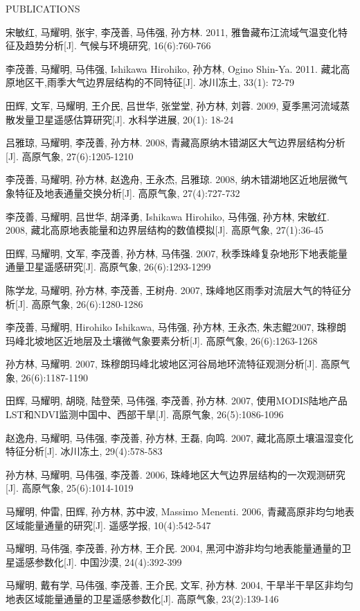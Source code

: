 \documentclass{resume} %
\begin{document}
\begin{rSection}{PUBLICATIONS}
\begin{etaremune}
  \item 宋敏红, 马耀明, 张宇, 李茂善, 马伟强, 孙方林. 2011, 雅鲁藏布江流域气温变化特征及趋势分析[J]. 气候与环境研究, 16(6):760-766
  \item 李茂善, 马耀明, 马伟强, Ishikawa Hirohiko, 孙方林, Ogino Shin-Ya. 2011. 藏北高原地区干,雨季大气边界层结构的不同特征[J]. 冰川冻土, 33(1): 72-79
  \item 田辉, 文军, 马耀明, 王介民, 吕世华, 张堂堂, 孙方林, 刘蓉. 2009, 夏季黑河流域蒸散发量卫星遥感估算研究[J]. 水科学进展, 20(1): 18-24
  \item  吕雅琼, 马耀明, 李茂善, 孙方林. 2008, 青藏高原纳木错湖区大气边界层结构分析[J]. 高原气象, 27(6):1205-1210
  \item 李茂善, 马耀明, 孙方林, 赵逸舟, 王永杰, 吕雅琼. 2008, 纳木错湖地区近地层微气象特征及地表通量交换分析[J]. 高原气象, 27(4):727-732
  \item 李茂善, 马耀明, 吕世华, 胡泽勇, Ishikawa Hirohiko, 马伟强, 孙方林, 宋敏红. 2008, 藏北高原地表能量和边界层结构的数值模拟[J]. 高原气象, 27(1):36-45
  \item 田辉, 马耀明, 文军, 李茂善, 孙方林, 马伟强. 2007, 秋季珠峰复杂地形下地表能量通量卫星遥感研究[J]. 高原气象, 26(6):1293-1299
  \item 陈学龙, 马耀明, 孙方林, 李茂善, 王树舟. 2007, 珠峰地区雨季对流层大气的特征分析[J]. 高原气象, 26(6):1280-1286
  \item 李茂善, 马耀明, Hirohiko Ishikawa, 马伟强, 孙方林, 王永杰, 朱志鲲2007, 珠穆朗玛峰北坡地区近地层及土壤微气象要素分析[J]. 高原气象, 26(6):1263-1268
  \item 孙方林, 马耀明. 2007, 珠穆朗玛峰北坡地区河谷局地环流特征观测分析[J]. 高原气象, 26(6):1187-1190
  \item 田辉, 马耀明, 胡晓, 陆登荣, 马伟强, 李茂善, 孙方林. 2007, 使用MODIS陆地产品LST和NDVI监测中国中、西部干旱[J]. 高原气象, 26(5):1086-1096
  \item 赵逸舟, 马耀明, 马伟强, 李茂善, 孙方林, 王磊, 向鸣. 2007, 藏北高原土壤温湿变化特征分析[J]. 冰川冻土, 29(4):578-583
  \item 孙方林, 马耀明, 马伟强, 李茂善. 2006, 珠峰地区大气边界层结构的一次观测研究[J]. 高原气象,
  25(6):1014-1019
  \item 马耀明, 仲雷, 田辉, 孙方林, 苏中波, Massimo Menenti. 2006, 青藏高原非均匀地表区域能量通量的研究[J]. 遥感学报, 10(4):542-547
  \item 马耀明, 马伟强, 李茂善, 孙方林, 王介民. 2004, 黑河中游非均匀地表能量通量的卫星遥感参数化[J]. 中国沙漠, 24(4):392-399
  \item 马耀明, 戴有学, 马伟强, 李茂善, 王介民, 文军, 孙方林. 2004, 干旱半干旱区非均匀地表区域能量通量的卫星遥感参数化[J]. 高原气象, 23(2):139-146
\end{etaremune}
\end{rSection}
\end{document}
